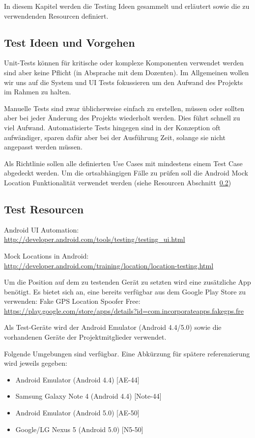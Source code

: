 In diesem Kapitel werden die Testing Ideen gesammelt und erläutert sowie die zu verwendenden Resourcen definiert.

\subsection{Test Ideen und Vorgehen}
Unit-Tests können für kritische oder komplexe Komponenten verwendet werden sind aber keine Pflicht (in Absprache mit dem Dozenten). 
Im Allgemeinen wollen wir uns auf die System und UI Tests fokussieren um den Aufwand des Projekts im Rahmen zu halten.

\medskip
Manuelle Tests sind zwar üblicherweise einfach zu erstellen, müssen oder sollten aber bei jeder Änderung des Projekts wiederholt werden. Dies führt schnell zu viel Aufwand. 
Automatisierte Tests hingegen sind in der Konzeption oft aufwändiger, sparen dafür aber bei der Ausführung Zeit, solange sie nicht angepasst werden müssen.

\medskip
Als Richtlinie sollen alle definierten Use Cases mit mindestens einem Test Case abgedeckt werden. 
Um die ortsabhängigen Fälle zu prüfen soll die Android Mock Location Funktionalität verwendet werden (siehe Resourcen Abschnitt~\ref{sec:test_resources})

\subsection{Test Resourcen}
\label{sec:test_resources}
Android UI Automation: \url{http://developer.android.com/tools/testing/testing_ui.html}

Mock Locations in Android: \url{http://developer.android.com/training/location/location-testing.html}

Um die Position auf dem zu testenden Gerät zu setzten wird eine zusätzliche App benötigt. Es bietet sich an, eine bereits verfügbar aus dem Google Play Store zu verwenden:
Fake GPS Location Spoofer Free: \url{https://play.google.com/store/apps/details?id=com.incorporateapps.fakegps.fre}

\medskip

Als Test-Geräte wird der Android Emulator (Android 4.4/5.0) sowie die vorhandenen Geräte der Projektmitglieder verwendet. 

\medskip
Folgende Umgebungen sind verfügbar. Eine Abkürzung für spätere referenzierung wird jeweils gegeben:

\begin{itemize}
\item Android Emulator (Android 4.4) [AE-44]
\item Samsung Galaxy Note 4 (Android 4.4) [Note-44]
\item Android Emulator (Android 5.0) [AE-50]
\item Google/LG Nexus 5 (Android 5.0) [N5-50]
\end{itemize}

